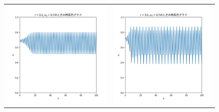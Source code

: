 \begin{figure}[htbp]
\begin{tabular}{cc}
    \begin{minipage}[t]{0.45\hsize}
      \centering
      \includegraphics[keepaspectratio, scale=0.3]{images/Problem1/ctest2_3_1.png}
    \end{minipage} &
    \begin{minipage}[t]{0.45\hsize}
      \centering
      \includegraphics[keepaspectratio, scale=0.3]{images/Problem1/ctest2_4_1.png}
    \end{minipage} \\


\end{tabular}
\end{figure}
